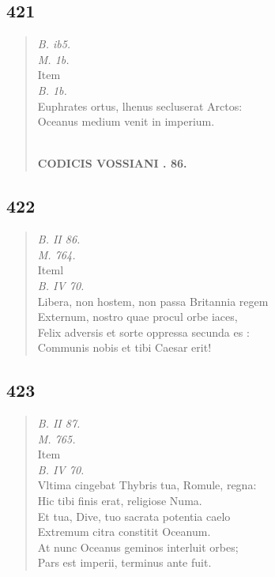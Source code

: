 \documentclass[11pt, a4paper]{report}
\begin{document}
            \subsection*{421}
      \begin{verse}
      \textit{B. ib5.} \\ \textit{M. 1b.} \\  \lbrack Item \rbrack  \\ \textit{B. 1b.} \\ Euphrates ortus, lhenus secluserat Arctos: \\ Oceanus medium venit in imperium. \\ 
        ﻿\pagebreak 
    \begin{center} \textbf{CODICIS VOSSIANI . 86.} \end{center} \marginpar{[325]} 
      \end{verse}
  
            \subsection*{422}
      \begin{verse}
      \textit{B. II 86.} \\ \textit{M. 764.} \\  \lbrack Iteml \\ \textit{B. IV 70.} \\ Libera, non hostem, non passa Britannia regem \\ Externum, nostro quae procul orbe iaces, \\ Felix adversis et sorte oppressa secunda  \lbrack es \rbrack : \\ Communis nobis et tibi Caesar erit! \\ 
      \end{verse}
  
            \subsection*{423}
      \begin{verse}
      \textit{B. II 87.} \\ \textit{M. 765.} \\  \lbrack Item \rbrack  \\ \textit{B. IV 70.} \\ Vltima cingebat Thybris tua, Romule, regna: \\ Hic tibi finis erat, religiose Numa. \\ Et tua, Dive, tuo sacrata potentia caelo \\ Extremum citra constitit Oceanum. \\ At nunc Oceanus geminos interluit orbes; \\ Pars est imperii, terminus ante fuit. \\ 
      \end{verse}
  
\end{document}
